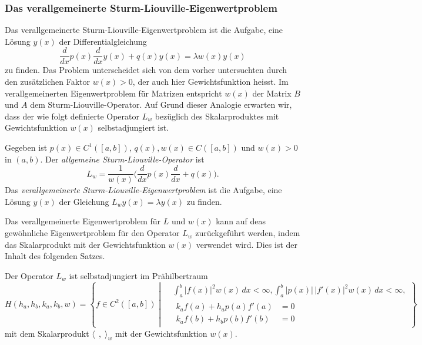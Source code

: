%
%
\subsubsection{Das verallgemeinerte Sturm-Liouville-Eigenwertproblem}
Das verallgemeinerte Sturm-Liouville-Eigenwertproblem ist die Aufgabe,
%
eine Lösung $y(x)$ der Differentialgleichung
\[
\frac{d}{dx}p(x)\frac{d}{dx} y(x)
+ q(x)y(x)
=
\lambda w(x) y(x)
\]
zu finden.
Das Problem unterscheidet sich von dem vorher untersuchten durch
den zusätzlichen Faktor $w(x)>0$, der auch hier Gewichtsfunktion heisst.
Im verallgemeinerten Eigenwertproblem für Matrizen entspricht $w(x)$ 
der Matrix $B$ und $A$ dem Sturm-Liouville-Operator.
Auf Grund dieser Analogie erwarten wir, dass der wie folgt
definierte Operator $L_w$ bezüglich des Skalarproduktes mit Gewichtsfunktion
$w(x)$ selbstadjungiert ist.

\begin{definition}
Gegeben ist $p(x)\in C^1([a,b])$, $q(x),w(x)\in C([a,b])$ und $w(x)>0$
in $(a,b)$.
Der {\em allgemeine Sturm-Liouville-Operator} ist
\[
L_w
=
\frac{1}{w(x)}
\biggl(
\frac{d}{dx}p(x)\frac{d}{dx}
+
q(x)
\biggr).
\]
Das {\em verallgemeinerte Sturm-Liouville-Eigenwertproblem} ist die Aufgabe,
eine Lösung $y(x)$ der Gleichung
\(
L_wy(x) = \lambda y(x)
\)
zu finden.
\end{definition}

Das verallgemeinerte Eigenwertproblem für $L$ und $w(x)$ kann auf
deas gewöhnliche Eigenwertproblem für den Operator $L_w$ 
zurückgeführt werden, indem das Skalarprodukt mit der Gewichtsfunktion
$w(x)$ verwendet wird.
Dies ist der Inhalt des folgenden Satzes.

\begin{satz}
Der Operator $L_w$ ist selbstadjungiert im Prähilbertraum
\[
H(h_a,h_b,k_a,k_b,w)
=
\left\{
f \in C^2([a,b])
\;
\left|
\;
\begin{aligned}
&\int_a^b |f(x)|^2w(x)\,dx < \infty,
\int_a^b |p(x)|\, |f'(x)|^2w(x)\,dx < \infty,
\\
&
\begin{aligned}
k_af(a) + h_ap(a)f'(a) &= 0 \\
k_af(b) + h_bp(b)f'(b) &= 0 
\end{aligned}
\end{aligned}
\right.
\right\}
\]
mit dem Skalarprodukt $\langle \;\,,\;\rangle_w$ mit der Gewichtsfunktion
$w(x)$.
\end{satz}

